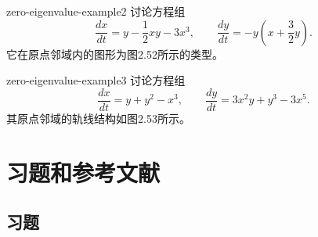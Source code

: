 \begin{example}{}{zero-eigenvalue-example2}
讨论方程组
\[
\dfrac{dx}{dt}=y-\dfrac12xy-3x^3,\qquad
\dfrac{dy}{dt}=-y\left(x+\dfrac32y\right).
\]
它在原点邻域内的图形为图2.52所示的类型。
\end{example}


\begin{example}{}{zero-eigenvalue-example3}
讨论方程组
\[
\dfrac{dx}{dt}=y+y^2-x^3,\qquad
\dfrac{dy}{dt}=3x^2y+y^3-3x^5.
\]
其原点邻域的轨线结构如图2.53所示。
\end{example}


\section*{习题和参考文献}
\subsection*{习题}

